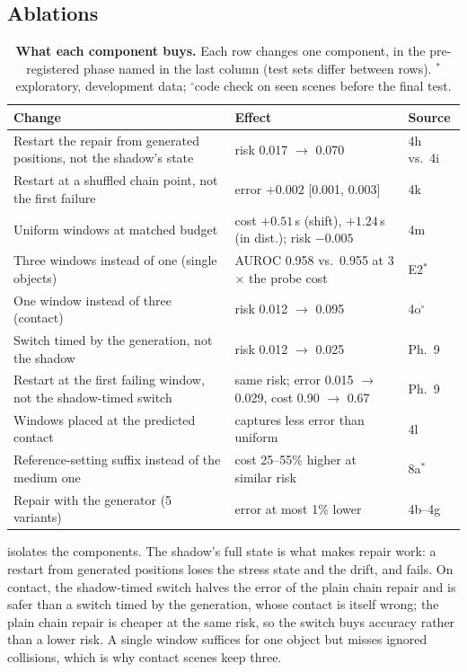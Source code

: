 \subsection{Ablations}
\label{sec:res-ablation}
\begin{table}[t]
\centering
\footnotesize
\setlength{\tabcolsep}{3pt}
\begin{tabular}{@{}>{\raggedright\arraybackslash}p{3.55cm}>{\raggedright\arraybackslash}p{2.75cm}l@{}}
\toprule
Change & Effect & Source \\
\midrule
Restart the repair from generated positions, not the shadow's state & risk 0.017 $\to$ 0.070 & 4h vs.\ 4i \\
Restart at a shuffled chain point, not the first failure & error $+0.002$ [0.001, 0.003] & 4k \\
Uniform windows at matched budget & cost $+0.51$\,s (shift), $+1.24$\,s (in dist.); risk $-0.005$ & 4m \\
Three windows instead of one (single objects) & AUROC 0.958 vs.\ 0.955 at 3$\times$ the probe cost & E2$^*$ \\
One window instead of three (contact) & risk 0.012 $\to$ 0.095 & 4o$^\circ$ \\
Switch timed by the generation, not the shadow & risk 0.012 $\to$ 0.025 & Ph.~9 \\
Restart at the first failing window, not the shadow-timed switch & same risk; error 0.015 $\to$ 0.029, cost 0.90 $\to$ 0.67 & Ph.~9 \\
Windows placed at the predicted contact & captures less error than uniform & 4l \\
Reference-setting suffix instead of the medium one & cost 25--55\% higher at similar risk & 8a$^*$ \\
Repair with the generator (5 variants) & error at most 1\% lower & 4b--4g \\
\bottomrule
\end{tabular}
\caption{\textbf{What each component buys.} Each row changes one component, in the pre-registered phase named in the last column (test sets differ between rows). $^*$exploratory, development data; $^\circ$code check on seen scenes before the final test.}
\label{tab:ablation}
\end{table}
 isolates the components.
The shadow's full state is what makes repair work: a restart from generated positions loses the stress state and the drift, and fails.
On contact, the shadow-timed switch halves the error of the plain chain repair and is safer than a switch timed by the generation, whose contact is itself wrong; the plain chain repair is cheaper at the same risk, so the switch buys accuracy rather than a lower risk.
A single window suffices for one object but misses ignored collisions, which is why contact scenes keep three.

